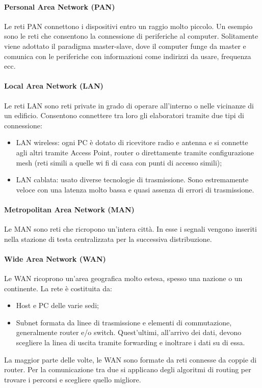 \documentclass{subfiles}
\begin{document}
    \paragraph{Personal Area Network (PAN)}
    Le reti PAN connettono i dispositivi entro un raggio molto piccolo. Un esempio sono le reti che consentono la connessione di 
    periferiche al computer. Solitamente viene adottato il paradigma master-slave, dove il computer funge da master e comunica con le 
    periferiche con informazioni come indirizzi da usare, frequenza ecc.

    \paragraph{Local Area Network (LAN)}
    Le reti LAN sono reti private in grado di operare all'interno o nelle vicinanze di un edificio. Consentono connettere tra loro gli 
    elaboratori tramite due tipi di connessione:
    \begin{itemize}
        \item LAN wireless: ogni PC è dotato di ricevitore radio e antenna e si connette agli altri tramite Access Point, router o 
        direttamente tramite configurazione mesh (reti simili a quelle wi fi di casa con punti di accesso simili);
        \item LAN cablata: usato diverse tecnologie di trasmissione. Sono estremamente veloce con una latenza molto bassa e quasi 
        assenza di errori di trasmissione. 
    \end{itemize}

    \paragraph{Metropolitan Area Network (MAN)}
    Le MAN sono reti che ricropono un'intera città. In esse i segnali vengono inseriti nella stazione di testa centralizzata per la 
    successiva distribuzione.

    \paragraph{Wide Area Network (WAN)}
    Le WAN ricoprono un'area geografica molto estesa, spesso una nazione o un continente. La rete è costituita da:
    \begin{itemize}
        \item Host e PC delle varie sedi;
        \item Subnet formata da linee di trasmissione e elementi di commutazione, generalmente router e/o switch. Quest'ultimi, 
        all'arrivo dei dati, devono scegliere la linea di uscita tramite forwarding e inoltrare i dati su di essa.
    \end{itemize}
    La maggior parte delle volte, le WAN sono formate da reti connesse da coppie di router. Per la comunicazione tra due si applicano 
    degli algoritmi di routing per trovare i percorsi e scegliere quello migliore.
\end{document}
